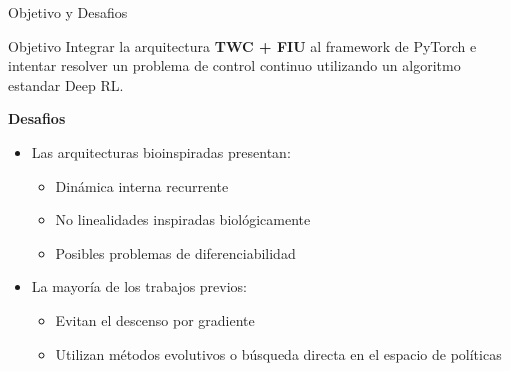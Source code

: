 \begin{frame}{Objetivo y Desafios}
  \begin{block}{Objetivo}
    Integrar la arquitectura \textbf{TWC + FIU} al framework de PyTorch e intentar resolver un problema de control continuo utilizando un algoritmo estandar Deep RL.
  \end{block}

  \textbf{Desafios}
  \begin{itemize}
    \item Las arquitecturas bioinspiradas presentan:
    \begin{itemize}
        \item Dinámica interna recurrente
        \item No linealidades inspiradas biológicamente
        \item Posibles problemas de diferenciabilidad
    \end{itemize}
    
    \item La mayoría de los trabajos previos:
    \begin{itemize}
        \item Evitan el descenso por gradiente
        \item Utilizan métodos evolutivos o búsqueda directa en el espacio de políticas
    \end{itemize}
\end{itemize}
\end{frame}